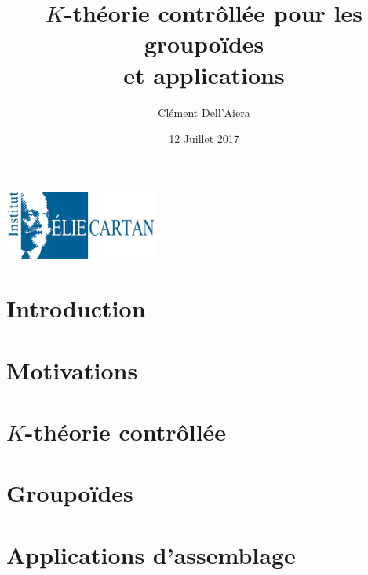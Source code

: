 \documentclass{beamer}
\title[First Steps with SCRATCH]{$K$-théorie contrôllée pour les groupoïdes\\ et applications}
\author{Clément Dell'Aiera}
\institute{IECL}
\date{12 Juillet 2017}
\begin{document}
\begin{frame}
  \titlepage
\begin{center}\includegraphics[width=5cm]{IECL.png}\end{center}
\end{frame}

\begin{frame}
  \tableofcontents
\end{frame}

\section{Introduction}


\section{Motivations}
\begin{frame}
  \tableofcontents[currentsection]
\end{frame}


\section{$K$-théorie contrôllée}
\begin{frame}
  \tableofcontents[currentsection]
\end{frame}


%

\section{Groupoïdes}
\begin{frame}
  \tableofcontents[currentsection]
\end{frame}



\section{Applications d'assemblage}
\begin{frame}
  \tableofcontents[currentsection]
\end{frame}

\end{document}
